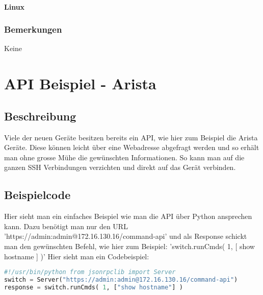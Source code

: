 \documentclass[a4,12pt]{scrartcl}
\begin{document}
\paragraph{Linux}
\subsubsection{Bemerkungen}
Keine

\section{API Beispiel - Arista}
\subsection{Beschreibung}
Viele der neuen Geräte besitzen bereits ein API, wie hier zum Beispiel die Arista Geräte. Diese können leicht über eine Webadresse abgefragt werden und so erhält man ohne grosse Mühe die gewünschten Informationen. So kann man auf die ganzen SSH Verbindungen verzichten und direkt auf das Gerät verbinden.
\subsection{Beispielcode}
Hier sieht man ein einfaches Beispiel wie man die API über Python ansprechen kann. Dazu benötigt man nur den URL 'https://admin:admin@172.16.130.16/command-api' und als Response schickt man den gewünschten Befehl, wie hier zum Beispiel: 'switch.runCmds( 1, [ \grqq show hostname \grqq ] )'\newline
Hier sieht man ein Codebeispiel:\newline
\begin{lstlisting}[language=python]
#!/usr/bin/python from jsonrpclib import Server
switch = Server("https://admin:admin@172.16.130.16/command-api")
response = switch.runCmds( 1, ["show hostname"] ) 
\end{lstlisting}
\end{document}
